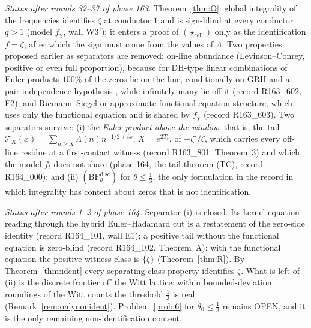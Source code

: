 \documentclass[11pt]{amsart}
\theoremstyle{definition}
\theoremstyle{remark}
\begin{document}
\noindent\emph{Status after rounds 32--37 of phase 163.} Theorem~\ref{thm:O}: global integrality of the frequencies
identifies $\zeta$ at conductor $1$ and is sign-blind at every conductor $q>1$ (model $f_\chi$, wall W3$'$); it enters a
proof of $(\star_{\mathrm{cell}})$ only as the identification $f=\zeta$, after which the sign must come from the values of
$\Lambda$. Two properties proposed earlier as separators are removed: on-line abundance (Levinson--Conrey, positive or even
full proportion), because for DH-type linear combinations of Euler products $100\%$ of the zeros lie on the line,
conditionally on GRH and a pair-independence hypothesis \cite{BombieriHejhal1995}, while infinitely many lie off it
\cite{KaczorowskiKulas2007,SaiasWeingartner2009} (record R163\_602, F2); and Riemann--Siegel or approximate functional equation structure, which uses only the functional equation and
is shared by $f_\chi$ (record R163\_603). Two separators survive: (i) the \emph{Euler product above the window}, that is, the
tail $\mathcal T_X(x)=\sum_{n\ge X}\Lambda(n)n^{-1/2+ix}$, $X=e^{2T_c}$, of $-\zeta'/\zeta$, which carries every off-line
residue at a first-contact witness (record R163\_801, Theorem~3) and which the model $f_t$ does not share (phase 164,
the tail theorem (TC), record R164\_000); and (ii) $(\mathrm{BF}^{\mathrm{disc}}_\theta)$ for $\theta\le\frac13$, the only
formulation in the record in which integrality has content about zeros that is not identification.

\noindent\emph{Status after rounds 1--2 of phase 164.} Separator (i) is closed. Its kernel-equation reading through the hybrid
Euler--Hadamard cut is a restatement of the zero-side identity (record R164\_101, wall E1); a positive tail without the functional
equation is zero-blind (record R164\_102, Theorem~A); with the functional equation the positive witness class is $\{\zeta\}$
(Theorem~\ref{thm:R}). By Theorem~\ref{thm:ident} every separating class property identifies $\zeta$. What is left of (ii) is
the discrete frontier off the Witt lattice: within bounded-deviation roundings of the Witt counts the threshold $\frac13$ is real
(Remark~\ref{rem:onlynonident}). Problem~\ref{prob:6} for $\theta_0\le\frac13$ remains OPEN, and it is the only remaining
non-identification content.
\end{document}
